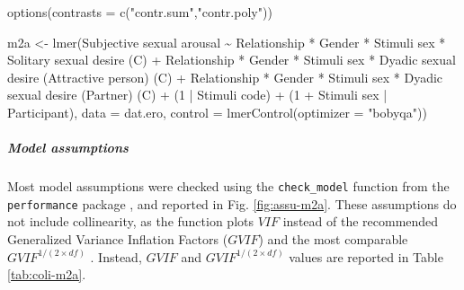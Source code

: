 \documentclass[
  bookmarksnumbered]{article}
\newenvironment{Shaded}{\begin{snugshade}}{\end{snugshade}}
\newcommand{\AttributeTok}[1]{\textcolor[rgb]{0.80,0.80,0.80}{#1}}
\newcommand{\DecValTok}[1]{\textcolor[rgb]{0.86,0.86,0.80}{#1}}
\newcommand{\FunctionTok}[1]{\textcolor[rgb]{0.94,0.94,0.56}{#1}}
\newcommand{\NormalTok}[1]{\textcolor[rgb]{0.80,0.80,0.80}{#1}}
\newcommand{\OtherTok}[1]{\textcolor[rgb]{0.94,0.94,0.56}{#1}}
\newcommand{\SpecialCharTok}[1]{\textcolor[rgb]{0.86,0.64,0.64}{#1}}
\newcommand{\StringTok}[1]{\textcolor[rgb]{0.80,0.58,0.58}{#1}}
\begin{document}
\begin{Shaded}
\begin{Highlighting}[]
\FunctionTok{options}\NormalTok{(}\AttributeTok{contrasts =} \FunctionTok{c}\NormalTok{(}\StringTok{"contr.sum"}\NormalTok{,}\StringTok{"contr.poly"}\NormalTok{))}

\NormalTok{m2a }\OtherTok{\textless{}{-}} \FunctionTok{lmer}\NormalTok{(}\StringTok{\textasciigrave{}}\AttributeTok{Subjective sexual arousal}\StringTok{\textasciigrave{}} \SpecialCharTok{\textasciitilde{}}
\NormalTok{            Relationship }\SpecialCharTok{*}\NormalTok{ Gender }\SpecialCharTok{*} \StringTok{\textasciigrave{}}\AttributeTok{Stimuli sex}\StringTok{\textasciigrave{}} \SpecialCharTok{*} \StringTok{\textasciigrave{}}\AttributeTok{Solitary sexual desire (C)}\StringTok{\textasciigrave{}} \SpecialCharTok{+}
\NormalTok{            Relationship }\SpecialCharTok{*}\NormalTok{ Gender }\SpecialCharTok{*} \StringTok{\textasciigrave{}}\AttributeTok{Stimuli sex}\StringTok{\textasciigrave{}} \SpecialCharTok{*} \StringTok{\textasciigrave{}}\AttributeTok{Dyadic sexual desire (Attractive person) (C)}\StringTok{\textasciigrave{}} \SpecialCharTok{+}
\NormalTok{            Relationship }\SpecialCharTok{*}\NormalTok{ Gender }\SpecialCharTok{*} \StringTok{\textasciigrave{}}\AttributeTok{Stimuli sex}\StringTok{\textasciigrave{}} \SpecialCharTok{*} \StringTok{\textasciigrave{}}\AttributeTok{Dyadic sexual desire (Partner) (C)}\StringTok{\textasciigrave{}} \SpecialCharTok{+}
\NormalTok{            (}\DecValTok{1} \SpecialCharTok{|} \StringTok{\textasciigrave{}}\AttributeTok{Stimuli code}\StringTok{\textasciigrave{}}\NormalTok{) }\SpecialCharTok{+}
\NormalTok{            (}\DecValTok{1} \SpecialCharTok{+} \StringTok{\textasciigrave{}}\AttributeTok{Stimuli sex}\StringTok{\textasciigrave{}} \SpecialCharTok{|}\NormalTok{ Participant),}
           \AttributeTok{data =}\NormalTok{ dat.ero,}
           \AttributeTok{control =} \FunctionTok{lmerControl}\NormalTok{(}\AttributeTok{optimizer =} \StringTok{"bobyqa"}\NormalTok{))}
\end{Highlighting}
\end{Shaded}

\hypertarget{model-assumptions-1}{%
\subparagraph{Model assumptions}\label{model-assumptions-1}}

Most model assumptions were checked using the \texttt{check\_model} function from the \texttt{performance} package \autocite{ludecke2021}, and reported in Fig. \ref{fig:assu-m2a}. These assumptions do not include collinearity, as the function plots \(VIF\) instead of the recommended Generalized Variance Inflation Factors (\(GVIF\)) and the most comparable \(GVIF^{{1}/{(2 \times df)}}\) \autocite{fox1992}. Instead, \(GVIF\) and \(GVIF^{{1}/{(2 \times df)}}\) values are reported in Table \ref{tab:coli-m2a}.
\end{document}
